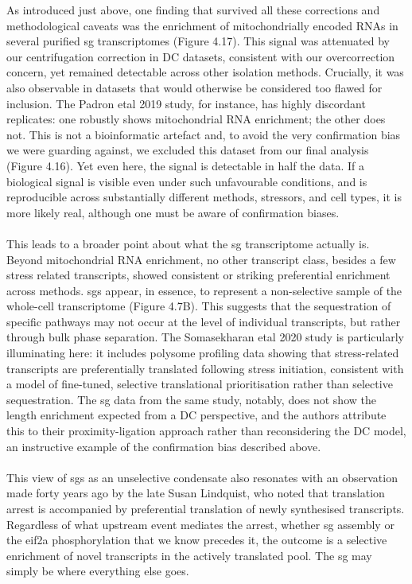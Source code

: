As introduced just above, one finding that survived all these corrections and methodological caveats was the enrichment of mitochondrially encoded RNAs in several purified \gls{sg} transcriptomes (Figure 4.17). This signal was attenuated by our centrifugation correction in DC datasets, consistent with our overcorrection concern, yet remained detectable across other isolation methods. Crucially, it was also observable in datasets that would otherwise be considered too flawed for inclusion. The Padron \gls{etal} 2019 study\cite{padron_proximity_2019}, for instance, has highly discordant replicates: one robustly shows mitochondrial RNA enrichment; the other does not. This is not a bioinformatic artefact and, to avoid the very confirmation bias we were guarding against, we excluded this dataset from our final analysis (Figure 4.16). Yet even here, the signal is detectable in half the data. If a biological signal is visible even under such unfavourable conditions, and is reproducible across substantially different methods, stressors, and cell types, it is more likely real, although one must be aware of confirmation biases.
\\
\\
This leads to a broader point about what the \gls{sg} transcriptome actually is. Beyond mitochondrial RNA enrichment, no other transcript class, besides a few stress related transcripts, showed consistent or striking preferential enrichment across methods. \glspl{sg} appear, in essence, to represent a non-selective sample of the whole-cell transcriptome (Figure 4.7B). This suggests that the sequestration of specific pathways may not occur at the level of individual transcripts, but rather through bulk phase separation. The Somasekharan \gls{etal} 2020 study\cite{somasekharan_g3bp1-linked_2020} is particularly illuminating here: it includes polysome profiling data showing that stress-related transcripts are preferentially translated following stress initiation, consistent with a model of fine-tuned, selective translational prioritisation rather than selective sequestration. The \gls{sg} data from the same study, notably, does not show the length enrichment expected from a DC perspective, and the authors attribute this to their proximity-ligation approach rather than reconsidering the DC model\cite{somasekharan_g3bp1-linked_2020}, an instructive example of the confirmation bias described above.
\\
\\
This view of \gls{sg}s as an unselective condensate also resonates with an observation made forty years ago by the late Susan Lindquist, who noted that translation arrest is accompanied by preferential translation of newly synthesised transcripts\cite{didomenico_heat_1982}. Regardless of what upstream event mediates the arrest, whether \gls{sg} assembly or the \gls{eif2a} phosphorylation that we know precedes it\cite{anderson_visibly_2002}, the outcome is a selective enrichment of novel transcripts in the actively translated pool. The \gls{sg} may simply be where everything else goes.
